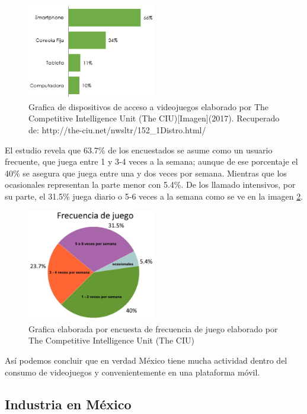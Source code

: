 \begin{figure}
	\centering
	\includegraphics[width=0.5\textwidth]{03MarcoTeorico/imageR/dispVid}
	\caption{Grafica de dispositivos de acceso a videojuegos elaborado por The Competitive Intelligence Unit (The CIU)[Imagen](2017). Recuperado de: http://the-ciu.net/nwsltr/152\_1Distro.html/}
	\label{fig:dispVid}
\end{figure}

 El estudio revela que 63.7\% de los encuestados se asume como un usuario frecuente, que juega entre 1 y 3-4 veces a la semana; aunque de ese porcentaje el 40\% se asegura que juega entre una y dos veces por semana. Mientras que los ocasionales representan la parte menor con 5.4\%. De los llamado intensivos, por su parte, el 31.5\% juega diario o 5-6 veces a la semana como se ve en la imagen \ref{fig:frecJue}.
\\[1pt] 

\begin{figure}
	\centering
	\includegraphics[width=0.5\textwidth]{03MarcoTeorico/imageR/frecJue}
	\caption{Grafica elaborada por encuesta de frecuencia de juego elaborado por The Competitive Intelligence Unit (The CIU)}
	\label{fig:frecJue}
\end{figure}

Así podemos concluir que en verdad México tiene mucha actividad dentro del consumo de videojuegos y convenientemente en una plataforma móvil.

\subsection{Industria en México}

